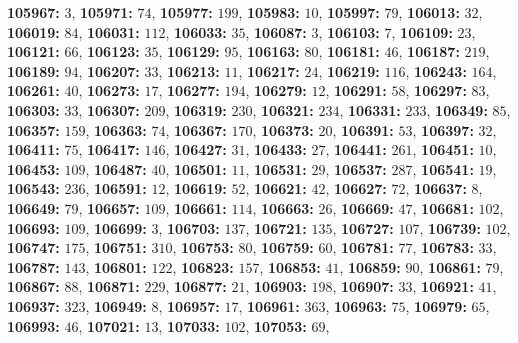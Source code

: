 \textsf{\bfseries 105967:} $3$, \textsf{\bfseries 105971:} $74$, \textsf{\bfseries 105977:} $199$, \textsf{\bfseries 105983:} $10$, \textsf{\bfseries 105997:} $79$, \textsf{\bfseries 106013:} $32$, \textsf{\bfseries 106019:} $84$, \textsf{\bfseries 106031:} $112$, \textsf{\bfseries 106033:} $35$, \textsf{\bfseries 106087:} $3$, \textsf{\bfseries 106103:} $7$, \textsf{\bfseries 106109:} $23$, \textsf{\bfseries 106121:} $66$, \textsf{\bfseries 106123:} $35$, \textsf{\bfseries 106129:} $95$, \textsf{\bfseries 106163:} $80$, \textsf{\bfseries 106181:} $46$, \textsf{\bfseries 106187:} $219$, \textsf{\bfseries 106189:} $94$, \textsf{\bfseries 106207:} $33$, \textsf{\bfseries 106213:} $11$, \textsf{\bfseries 106217:} $24$, \textsf{\bfseries 106219:} $116$, \textsf{\bfseries 106243:} $164$, \textsf{\bfseries 106261:} $40$, \textsf{\bfseries 106273:} $17$, \textsf{\bfseries 106277:} $194$, \textsf{\bfseries 106279:} $12$, \textsf{\bfseries 106291:} $58$, \textsf{\bfseries 106297:} $83$, \textsf{\bfseries 106303:} $33$, \textsf{\bfseries 106307:} $209$, \textsf{\bfseries 106319:} $230$, \textsf{\bfseries 106321:} $234$, \textsf{\bfseries 106331:} $233$, \textsf{\bfseries 106349:} $85$, \textsf{\bfseries 106357:} $159$, \textsf{\bfseries 106363:} $74$, \textsf{\bfseries 106367:} $170$, \textsf{\bfseries 106373:} $20$, \textsf{\bfseries 106391:} $53$, \textsf{\bfseries 106397:} $32$, \textsf{\bfseries 106411:} $75$, \textsf{\bfseries 106417:} $146$, \textsf{\bfseries 106427:} $31$, \textsf{\bfseries 106433:} $27$, \textsf{\bfseries 106441:} $261$, \textsf{\bfseries 106451:} $10$, \textsf{\bfseries 106453:} $109$, \textsf{\bfseries 106487:} $40$, \textsf{\bfseries 106501:} $11$, \textsf{\bfseries 106531:} $29$, \textsf{\bfseries 106537:} $287$, \textsf{\bfseries 106541:} $19$, \textsf{\bfseries 106543:} $236$, \textsf{\bfseries 106591:} $12$, \textsf{\bfseries 106619:} $52$, \textsf{\bfseries 106621:} $42$, \textsf{\bfseries 106627:} $72$, \textsf{\bfseries 106637:} $8$, \textsf{\bfseries 106649:} $79$, \textsf{\bfseries 106657:} $109$, \textsf{\bfseries 106661:} $114$, \textsf{\bfseries 106663:} $26$, \textsf{\bfseries 106669:} $47$, \textsf{\bfseries 106681:} $102$, \textsf{\bfseries 106693:} $109$, \textsf{\bfseries 106699:} $3$, \textsf{\bfseries 106703:} $137$, \textsf{\bfseries 106721:} $135$, \textsf{\bfseries 106727:} $107$, \textsf{\bfseries 106739:} $102$, \textsf{\bfseries 106747:} $175$, \textsf{\bfseries 106751:} $310$, \textsf{\bfseries 106753:} $80$, \textsf{\bfseries 106759:} $60$, \textsf{\bfseries 106781:} $77$, \textsf{\bfseries 106783:} $33$, \textsf{\bfseries 106787:} $143$, \textsf{\bfseries 106801:} $122$, \textsf{\bfseries 106823:} $157$, \textsf{\bfseries 106853:} $41$, \textsf{\bfseries 106859:} $90$, \textsf{\bfseries 106861:} $79$, \textsf{\bfseries 106867:} $88$, \textsf{\bfseries 106871:} $229$, \textsf{\bfseries 106877:} $21$, \textsf{\bfseries 106903:} $198$, \textsf{\bfseries 106907:} $33$, \textsf{\bfseries 106921:} $41$, \textsf{\bfseries 106937:} $323$, \textsf{\bfseries 106949:} $8$, \textsf{\bfseries 106957:} $17$, \textsf{\bfseries 106961:} $363$, \textsf{\bfseries 106963:} $75$, \textsf{\bfseries 106979:} $65$, \textsf{\bfseries 106993:} $46$, \textsf{\bfseries 107021:} $13$, \textsf{\bfseries 107033:} $102$, \textsf{\bfseries 107053:} $69$, 
